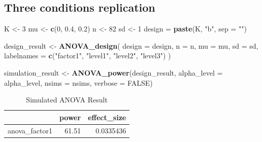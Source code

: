 \documentclass[]{book}
\newenvironment{Shaded}{\begin{snugshade}}{\end{snugshade}}
\newcommand{\DataTypeTok}[1]{\textcolor[rgb]{0.13,0.29,0.53}{#1}}
\newcommand{\DecValTok}[1]{\textcolor[rgb]{0.00,0.00,0.81}{#1}}
\newcommand{\FloatTok}[1]{\textcolor[rgb]{0.00,0.00,0.81}{#1}}
\newcommand{\KeywordTok}[1]{\textcolor[rgb]{0.13,0.29,0.53}{\textbf{#1}}}
\newcommand{\NormalTok}[1]{#1}
\newcommand{\OtherTok}[1]{\textcolor[rgb]{0.56,0.35,0.01}{#1}}
\newcommand{\StringTok}[1]{\textcolor[rgb]{0.31,0.60,0.02}{#1}}
\begin{document}
\hypertarget{three-conditions-replication-2}{%
\subsection{Three conditions replication}\label{three-conditions-replication-2}}

\begin{Shaded}
\begin{Highlighting}[]
\NormalTok{K <-}\StringTok{ }\DecValTok{3}
\NormalTok{mu <-}\StringTok{ }\KeywordTok{c}\NormalTok{(}\DecValTok{0}\NormalTok{, }\FloatTok{0.4}\NormalTok{, }\FloatTok{0.2}\NormalTok{)}
\NormalTok{n <-}\StringTok{ }\DecValTok{82}
\NormalTok{sd <-}\StringTok{ }\DecValTok{1}
\NormalTok{design =}\StringTok{ }\KeywordTok{paste}\NormalTok{(K, }\StringTok{"b"}\NormalTok{, }\DataTypeTok{sep =} \StringTok{""}\NormalTok{)}
\end{Highlighting}
\end{Shaded}

\begin{Shaded}
\begin{Highlighting}[]
\NormalTok{design_result <-}\StringTok{ }\KeywordTok{ANOVA_design}\NormalTok{(}
  \DataTypeTok{design =}\NormalTok{ design,}
  \DataTypeTok{n =}\NormalTok{ n,}
  \DataTypeTok{mu =}\NormalTok{ mu,}
  \DataTypeTok{sd =}\NormalTok{ sd,}
  \DataTypeTok{labelnames =} \KeywordTok{c}\NormalTok{(}\StringTok{"factor1"}\NormalTok{, }\StringTok{"level1"}\NormalTok{, }\StringTok{"level2"}\NormalTok{, }\StringTok{"level3"}\NormalTok{)}
\NormalTok{  )}
\end{Highlighting}
\end{Shaded}

\begin{Shaded}
\begin{Highlighting}[]
\NormalTok{simulation_result <-}\StringTok{ }\KeywordTok{ANOVA_power}\NormalTok{(design_result, }
                                 \DataTypeTok{alpha_level =}\NormalTok{ alpha_level, }
                                 \DataTypeTok{nsims =}\NormalTok{ nsims,}
                                 \DataTypeTok{verbose =} \OtherTok{FALSE}\NormalTok{)}
\end{Highlighting}
\end{Shaded}

\begin{table}[!h]

\caption{\label{tab:unnamed-chunk-75}Simulated ANOVA Result}
\centering
\begin{tabular}{l|r|r}
\hline
  & power & effect\_size\\
\hline
anova\_factor1 & 61.51 & 0.0335436\\
\hline
\end{tabular}
\end{table}
\end{document}
